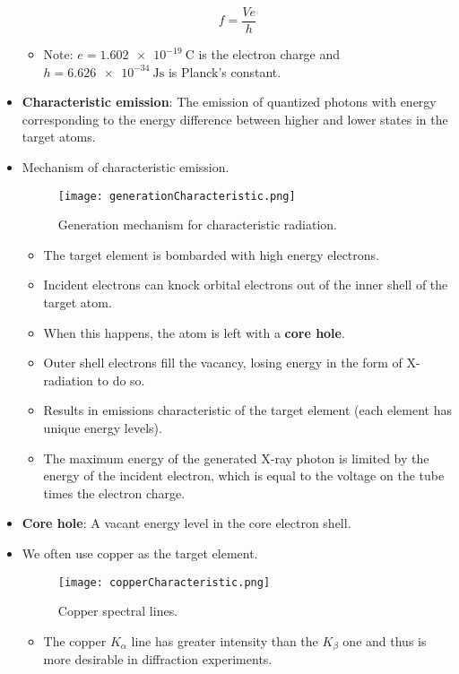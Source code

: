 \documentclass[../notes.tex]{subfiles}
\begin{document}
\begin{itemize}
\begin{equation*}
        f = \frac{Ve}{h}
    \end{equation*}
    \begin{itemize}
        \item Note: $e=\SI{1.602e-19}{\coulomb}$ is the electron charge and $h=\SI{6.626e-34}{\joule\second}$ is Planck's constant.
    \end{itemize}
    \item \textbf{Characteristic emission}: The emission of quantized photons with energy corresponding to the energy difference between higher and lower states in the target atoms.
    \item Mechanism of characteristic emission.
    \begin{figure}[h!]
        \centering
        \texttt{[image: generationCharacteristic.png]}
        \caption{Generation mechanism for characteristic radiation.}
        \label{fig:generationCharacteristic}
    \end{figure}
    \begin{itemize}
        \item The target element is bombarded with high energy electrons.
        \item Incident electrons can knock orbital electrons out of the inner shell of the target atom.
        \item When this happens, the atom is left with a \textbf{core hole}.
        \item Outer shell electrons fill the vacancy, losing energy in the form of X-radiation to do so.
        \item Results in emissions characteristic of the target element (each element has unique energy levels).
        \item The maximum energy of the generated X-ray photon is limited by the energy of the incident electron, which is equal to the voltage on the tube times the electron charge.
    \end{itemize}
    \item \textbf{Core hole}: A vacant energy level in the core electron shell.
    \item We often use copper as the target element.
    \begin{figure}[H]
        \centering
        \texttt{[image: copperCharacteristic.png]}
        \caption{Copper spectral lines.}
        \label{fig:copperCharacteristic}
    \end{figure}
    \begin{itemize}
        \item The copper $K_\alpha$ line has greater intensity than the $K_\beta$ one and thus is more desirable in diffraction experiments.

\end{itemize}
\end{itemize}
\end{document}
